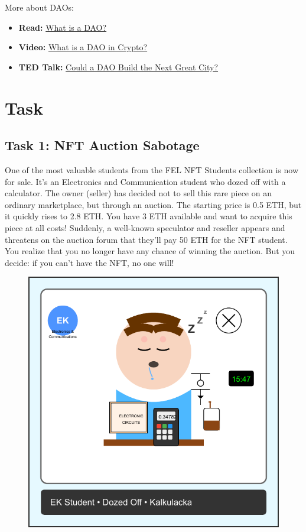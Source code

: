 \documentclass[12pt]{article}
\begin{document}
\medskip
\noindent
More about DAOs:
\begin{itemize}
    \item \textbf{Read:} \href{https://ethereum.org/dao/#what-are-daos}{What is a DAO?}
    \item \textbf{Video:} \href{https://www.youtube.com/watch?v=KHm0uUPqmVE}{What is a DAO in Crypto?}
    \item \textbf{TED Talk:} \href{https://www.youtube.com/watch?v=zTStDvUtQWc}{Could a DAO Build the Next Great City?}
\end{itemize}

\section{Task}

\subsection*{Task 1: NFT Auction Sabotage}

One of the most valuable students from the FEL NFT Students collection is now
for sale. It's an Electronics and Communication student who dozed off with a
calculator. The owner (seller) has decided not to sell this rare piece on an
ordinary marketplace, but through an auction. The starting price is 0.5 ETH,
but it quickly rises to 2.8 ETH. You have 3 ETH available and want to acquire
this piece at all costs! Suddenly, a well-known speculator and reseller appears
and threatens on the auction forum that they'll pay 50 ETH for the NFT student.
You realize that you no longer have any chance of winning the auction. But you
decide: if you can't have the NFT, no one will!

\begin{figure}[h!]
    \centering
    \begin{minipage}{0.3\textwidth}
        \includegraphics[width=\textwidth]{NFTs/ek-student-nft.pdf}
    \end{minipage}
\end{figure}
\end{document}
